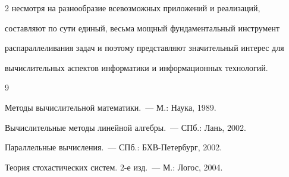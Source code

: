 \begin{multicols}{2}
несмотря на разнообразие всевозможных приложений и реализаций,


со\-став\-ля\-ют по сути единый, весьма мощный фундаментальный инструмент


распараллеливания задач и поэтому представляют значительный интерес для


вычислительных аспектов информатики и информационных технологий.





\vspace*{-6pt}


{\small\frenchspacing


{%




\begin{thebibliography}{9}






Методы вычислительной математики.~--- М.: Наука, 1989.









Вычислительные методы линейной алгебры.~--- СПб.: Лань, 2002.









Параллельные вычисления.~--- СПб.: БХВ-Петербург, 2002.





\label{end\stat}









Теория стохастических систем. 2-е изд.~--- М.: Логос, 2004.


\end{thebibliography}


}


}


\end{multicols}


